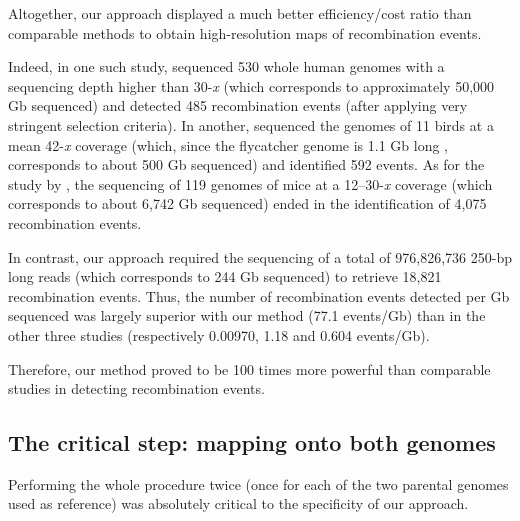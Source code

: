 Altogether, our approach displayed a much better efficiency/cost ratio than comparable methods to obtain high-resolution maps of recombination events.

Indeed, in one such study, \citet{halldorsson2016rate} sequenced 530 whole human genomes with a sequencing depth higher than 30-\textit{x} (which corresponds to approximately 50,000 Gb sequenced) and detected 485 recombination events (after applying very stringent selection criteria).
In another, \citet{smeds2016highresolution} sequenced the genomes of 11 birds at a mean 42-\textit{x} coverage (which, since the flycatcher genome is 1.1 Gb long \citep{ellegren2012genomic}, corresponds to about 500 Gb sequenced) and identified 592 events.
As for the study by \citet{li2018highresolution}, the sequencing of 119 genomes of mice at a 12--30-\textit{x} coverage (which corresponds to about 6,742 Gb sequenced) ended in the identification of 4,075 recombination events.

In contrast, our approach required the sequencing of a total of 976,826,736 250-bp long reads (which corresponds to 244 Gb sequenced) to retrieve 18,821 recombination events. 
Thus, the number of recombination events detected per Gb sequenced was largely superior with our method (77.1 events/Gb) than in the other three studies (respectively 0.00970, 1.18 and 0.604 events/Gb). 

Therefore, our method proved to be 100 times more powerful than comparable studies in detecting recombination events.




\subsection{The critical step: mapping onto both genomes}


Performing the whole procedure twice (once for each of the two parental genomes used as reference) was absolutely critical to the specificity of our approach.

